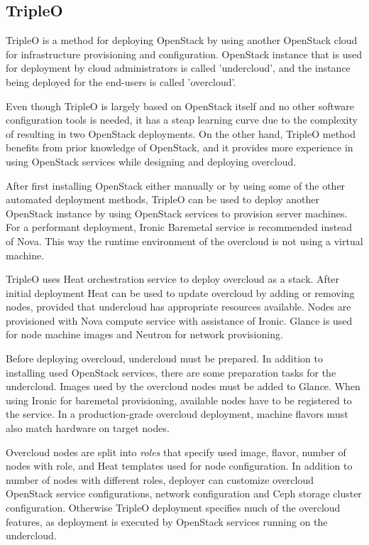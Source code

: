 \subsection{TripleO}

TripleO \cite{tripleo} is a method for deploying OpenStack by using another
OpenStack cloud for infrastructure provisioning and configuration. OpenStack
instance that is used for deployment by cloud administrators is called
'undercloud', and the instance being deployed for the end-users is called
'overcloud'.

Even though TripleO is largely based on OpenStack itself and no other software
configuration tools is needed, it has a steap learning curve due to the
complexity of resulting in two OpenStack deployments. On the other hand,
TripleO method benefits from prior knowledge of OpenStack, and it provides more
experience in using OpenStack services while designing and deploying overcloud.

After first installing OpenStack either manually or by using some of the other
automated deployment methods, TripleO can be used to deploy another OpenStack
instance by using OpenStack services to provision server machines. For a
performant deployment, Ironic Baremetal service is recommended instead of Nova.
This way the runtime environment of the overcloud is not using a virtual
machine.

TripleO uses Heat orchestration service to deploy overcloud as a stack. After
initial deployment Heat can be used to update overcloud by adding or removing
nodes, provided that undercloud has appropriate resources available. Nodes are
provisioned with Nova compute service with assistance of Ironic. Glance is used
for node machine images and Neutron for network provisioning.

Before deploying overcloud, undercloud must be prepared. In addition to
installing used OpenStack services, there are some preparation tasks for the
undercloud. Images used by the overcloud nodes must be added to Glance. When
using Ironic for baremetal provisioning, available nodes have to be registered
to the service. In a production-grade overcloud deployment, machine flavors
must also match hardware on target nodes.

Overcloud nodes are split into \textit{roles} that specify used image, flavor,
number of nodes with role, and Heat templates used for node configuration. In
addition to number of nodes with different roles, deployer can customize
overcloud OpenStack service configurations, network configuration and Ceph
storage cluster configuration. Otherwise TripleO deployment specifies much of
the overcloud features, as deployment is executed by OpenStack services running
on the undercloud.

